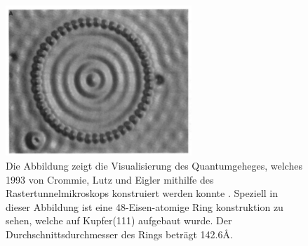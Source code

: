 \begin{figure}
\includegraphics[width=7cm]{pics/quantum_corral}
\caption{Die Abbildung zeigt die 
    Visualisierung des Quantumgeheges, welches 1993 von 
    Crommie, Lutz und Eigler mithilfe des Rastertunnelmikroskops
    konstruiert werden konnte \cite{crommie1993imaging}. 
    Speziell in dieser Abbildung ist eine 48-Eisen-atomige 
Ring konstruktion zu sehen, welche auf Kupfer(111) aufgebaut wurde.
Der Durchschnittsdurchmesser des Rings beträgt 142.6\r{A}.}
 \label{fig:quantum_corral}
\end{figure}


